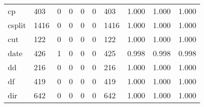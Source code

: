 \begin{longtable}{lp{1.3cm}p{1.3cm}p{1.3cm}p{1.3cm}p{1.3cm}p{1.3cm}p{1.3cm}p{1.3cm}p{1.3cm}}
cp        &                    403 &                                  0 &                                 0 &                                0 &                                 0 &                             403 &                                1.000 &                                  1.000 &                                1.000 \\
csplit    &                   1416 &                                  0 &                                 0 &                                0 &                                 0 &                            1416 &                                1.000 &                                  1.000 &                                1.000 \\
cut       &                    122 &                                  0 &                                 0 &                                0 &                                 0 &                             122 &                                1.000 &                                  1.000 &                                1.000 \\
date      &                    426 &                                  1 &                                 0 &                                0 &                                 0 &                             425 &                                0.998 &                                  0.998 &                                0.998 \\
dd        &                    216 &                                  0 &                                 0 &                                0 &                                 0 &                             216 &                                1.000 &                                  1.000 &                                1.000 \\
df        &                    419 &                                  0 &                                 0 &                                0 &                                 0 &                             419 &                                1.000 &                                  1.000 &                                1.000 \\
dir       &                    642 &                                  0 &                                 0 &                                0 &                                 0 &                             642 &                                1.000 &                                  1.000 &                                1.000 \\

\end{longtable}
